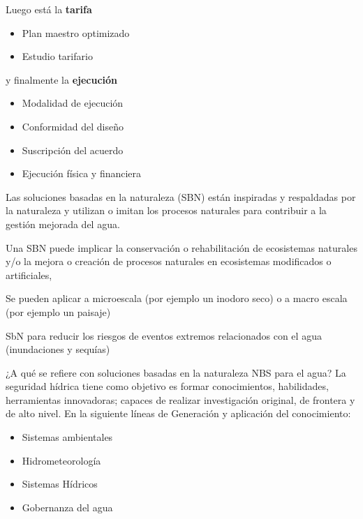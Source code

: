Luego está la \textbf{tarifa} 
\begin{itemize}
    \item Plan maestro optimizado
    \item Estudio tarifario
\end{itemize}

y finalmente la \textbf{ejecución}
\begin{itemize}
    \item Modalidad de ejecución
    \item Conformidad del diseño
    \item Suscripción del acuerdo
    \item Ejecución física y financiera
\end{itemize}

Las soluciones basadas en la naturaleza (SBN) están inspiradas y respaldadas por la naturaleza y utilizan o imitan los procesos naturales para contribuir a la gestión mejorada del agua.

Una SBN puede implicar la conservación o rehabilitación de ecosistemas naturales y/o la mejora o creación de procesos naturales en ecosistemas modificados o artificiales,


Se pueden aplicar a microescala (por ejemplo un inodoro seco) o a macro escala (por ejemplo un paisaje)

SbN para reducir los riesgos de eventos extremos relacionados con el agua (inundaciones y sequías)

¿A qué se refiere con soluciones basadas en la naturaleza NBS para el agua?
La seguridad hídrica tiene como objetivo es formar conocimientos, habilidades, herramientas innovadoras; capaces de realizar investigación original, de frontera y de alto nivel. En la siguiente líneas de Generación y aplicación del conocimiento:
\begin{itemize}
  \item Sistemas ambientales
  \item Hidrometeorología
  \item Sistemas Hídricos
  \item Gobernanza del agua
\end{itemize}


